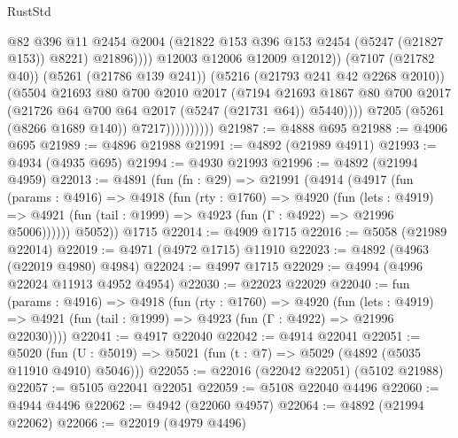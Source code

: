\begin{lexlean}{RustStd}
\begin{coremodule}
                                      @82
                                      @396
                                      @11
                                      @2454
                                      @2004
                                      (@21822 @153 @396 @153 @2454 (@5247 (@21827 @153)) @8221)
                                      @21896))))
                              @12003
                              @12006
                              @12009
                              @12012))
                          (@7107 (@21782 @40))
                          (@5261 (@21786 @139 @241))
                          (@5216 (@21793 @241 @42 @2268 @2010))
                          (@5504
                            @21693
                            @80
                            @700
                            @2010
                            @2017
                            (@7194
                              @21693
                              @1867
                              @80
                              @700
                              @2017
                              (@21726 @64 @700 @64 @2017 (@5247 (@21731 @64)) @5440))))
                        @7205
                        (@5261 (@8266 @1689 @140))
                        @7217))))))))))
@21987 := @4888 @695
@21988 := @4906 @695
@21989 := @4896 @21988
@21991 := @4892 (@21989 @4911)
@21993 := @4934 (@4935 @695)
@21994 := @4930 @21993
@21996 := @4892 (@21994 @4959)
@22013 := @4891
    (fun (fn : @29) =>
    @21991
      (@4914
        (@4917
          (fun (params : @4916) =>
          @4918
            (fun (rty : @1760) =>
            @4920
              (fun (lets : @4919) =>
              @4921 (fun (tail : @1999) => @4923 (fun (Γ : @4922) => @21996 @5006))))))
        @5052))
    @1715
@22014 := @4909 @1715
@22016 := @5058 (@21989 @22014)
@22019 := @4971 (@4972 @1715) @11910
@22023 := @4892 (@4963 (@22019 @4980) @4984)
@22024 := @4997 @1715
@22029 := @4994 (@4996 @22024 @11913 @4952 @4954)
@22030 := @22023 @22029
@22040 := fun (params : @4916) =>
  @4918
    (fun (rty : @1760) =>
    @4920
      (fun (lets : @4919) =>
      @4921 (fun (tail : @1999) => @4923 (fun (Γ : @4922) => @21996 @22030))))
@22041 := @4917 @22040
@22042 := @4914 @22041
@22051 := @5020
    (fun (U : @5019) => @5021 (fun (t : @7) => @5029 (@4892 (@5035 @11910 @4910) @5046)))
@22055 := @22016 (@22042 @22051) (@5102 @21988)
@22057 := @5105 @22041 @22051
@22059 := @5108 @22040 @4496
@22060 := @4944 @4496
@22062 := @4942 (@22060 @4957)
@22064 := @4892 (@21994 @22062)
@22066 := @22019 (@4979 @4496)

\end{coremodule}
\end{lexlean}
